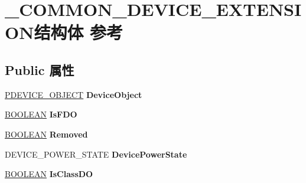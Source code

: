 \hypertarget{struct___c_o_m_m_o_n___d_e_v_i_c_e___e_x_t_e_n_s_i_o_n}{}\section{\+\_\+\+C\+O\+M\+M\+O\+N\+\_\+\+D\+E\+V\+I\+C\+E\+\_\+\+E\+X\+T\+E\+N\+S\+I\+O\+N结构体 参考}
\label{struct___c_o_m_m_o_n___d_e_v_i_c_e___e_x_t_e_n_s_i_o_n}
\subsection*{Public 属性}
\begin{DoxyCompactItemize}
\item 
\mbox{\label{struct___c_o_m_m_o_n___d_e_v_i_c_e___e_x_t_e_n_s_i_o_n_a3cafc04cb57a9674cc927a15ffbe4309}} 
\hyperlink{struct___d_e_v_i_c_e___o_b_j_e_c_t}{P\+D\+E\+V\+I\+C\+E\+\_\+\+O\+B\+J\+E\+CT} {\bfseries Device\+Object}
\item 
\mbox{\label{struct___c_o_m_m_o_n___d_e_v_i_c_e___e_x_t_e_n_s_i_o_n_a7739791e6389caaa6974158f274db813}} 
\hyperlink{_processor_bind_8h_a112e3146cb38b6ee95e64d85842e380a}{B\+O\+O\+L\+E\+AN} {\bfseries Is\+F\+DO}
\item 
\mbox{\label{struct___c_o_m_m_o_n___d_e_v_i_c_e___e_x_t_e_n_s_i_o_n_a7c52e8a8f1fedd61113745ebeffdebfa}} 
\hyperlink{_processor_bind_8h_a112e3146cb38b6ee95e64d85842e380a}{B\+O\+O\+L\+E\+AN} {\bfseries Removed}
\item 
\mbox{\label{struct___c_o_m_m_o_n___d_e_v_i_c_e___e_x_t_e_n_s_i_o_n_a0f321dd5ac9ae2f036e7836f33653869}} 
D\+E\+V\+I\+C\+E\+\_\+\+P\+O\+W\+E\+R\+\_\+\+S\+T\+A\+TE {\bfseries Device\+Power\+State}
\item 
\mbox{\label{struct___c_o_m_m_o_n___d_e_v_i_c_e___e_x_t_e_n_s_i_o_n_abcfb7fee8e45d951852b97fac6f1fb14}} 
\hyperlink{_processor_bind_8h_a112e3146cb38b6ee95e64d85842e380a}{B\+O\+O\+L\+E\+AN} {\bfseries Is\+Class\+DO}

\end{DoxyCompactItemize}
